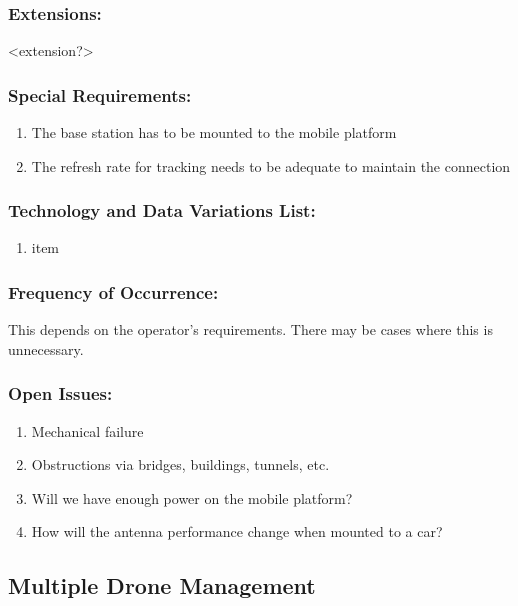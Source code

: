 \documentclass[ProductRequirements.tex]{subfiles}
\begin{document}
	\subsubsection*{Extensions:}
	<extension?>
	\subsubsection*{Special Requirements:}
	\begin{enumerate}\itemsep1pt
		\item The base station has to be mounted to the mobile platform
		\item The refresh rate for tracking needs to be adequate to maintain the connection
	\end{enumerate}
	\subsubsection*{Technology and Data Variations List:}
	\begin{enumerate}\itemsep1pt
		\item item
	\end{enumerate}
	\subsubsection*{Frequency of Occurrence:}
	This depends on the operator's requirements. There may be cases where this is unnecessary.
	\subsubsection*{Open Issues:}
	\begin{enumerate}\itemsep1pt
		\item Mechanical failure
		\item Obstructions via bridges, buildings, tunnels, etc.
		\item Will we have enough power on the mobile platform?
		\item How will the antenna performance change when mounted to a car?
	\end{enumerate}	
	
	\subsection{Multiple Drone Management}
\end{document}
